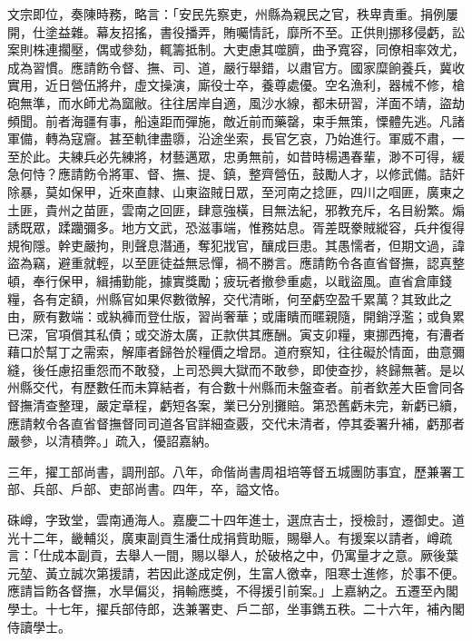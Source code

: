 \begin{pinyinscope}
文宗即位，奏陳時務，略言：「安民先察吏，州縣為親民之官，秩卑責重。捐例屢開，仕塗益雜。幕友招搖，書役播弄，賄囑情託，靡所不至。正供則挪移侵虧，訟案則株連擱壓，偶或參劾，輒籌抵制。大吏慮其噬臍，曲予寬容，同僚相率效尤，成為習慣。應請飭令督、撫、司、道，嚴行舉錯，以肅官方。國家糜餉養兵，冀收實用，近日營伍將弁，虛文操演，廝役士卒，養尊處優。空名漁利，器械不修，槍砲無準，而水師尤為窳敝。往往居岸自適，風沙水線，都未研習，洋面不靖，盜劫頻聞。前者海疆有事，船遠距而彈施，敵近前而藥罄，束手無策，慄體先逃。凡諸軍備，轉為寇齎。甚至軌律盡隳，沿途坐索，長官乞哀，乃始進行。軍威不肅，一至於此。夫練兵必先練將，材藝邁眾，忠勇無前，如昔時楊遇春輩，渺不可得，緩急何恃？應請飭令將軍、督、撫、提、鎮，整齊營伍，鼓勵人才，以修武備。詰奸除暴，莫如保甲，近來直隸、山東盜賊日眾，至河南之捻匪，四川之啯匪，廣東之土匪，貴州之苗匪，雲南之回匪，肆意強橫，目無法紀，邪教充斥，名目紛繁。煽誘既眾，蹂躪彌多。地方文武，恐滋事端，惟務姑息。胥差既豢賊縱容，兵弁復得規徇隱。幹吏嚴拘，則聲息潛通，奪犯戕官，釀成巨患。其愚懦者，但期文過，諱盜為竊，避重就輕，以至匪徒益無忌憚，禍不勝言。應請飭令各直省督撫，認真整頓，奉行保甲，緝捕勤能，據實獎勵；疲玩者撤參重處，以戢盜風。直省倉庫錢糧，各有定額，州縣官如果侭數徵解，交代清晰，何至虧空盈千累萬？其致此之由，厥有數端：或紈褲而登仕版，習尚奢華；或庸瞶而暱親隨，開銷浮濫；或負累已深，官項償其私債；或交游太廣，正款供其應酬。寅支卯糧，東挪西掩，有漕者藉口於幫丁之需索，解庫者歸咎於糧價之增昂。道府察知，往往礙於情面，曲意彌縫，後任慮招重怨而不敢發，上司恐興大獄而不敢參，即使查抄，終歸無著。是以州縣交代，有歷數任而未算結者，有合數十州縣而未盤查者。前者欽差大臣會同各督撫清查整理，嚴定章程，虧短各案，業已分別攤賠。第恐舊虧未完，新虧已續，應請敕令各直省督撫督同司道各官詳細查覈，交代未清者，停其委署升補，虧那者嚴參，以清積弊。」疏入，優詔嘉納。

三年，擢工部尚書，調刑部。八年，命偕尚書周祖培等督五城團防事宜，歷兼署工部、兵部、戶部、吏部尚書。四年，卒，謚文恪。

硃嶟，字致堂，雲南通海人。嘉慶二十四年進士，選庶吉士，授檢討，遷御史。道光十二年，畿輔災，廣東副貢生潘仕成捐貲助賑，賜舉人。有援案以請者，嶟疏言：「仕成本副貢，去舉人一間，賜以舉人，於破格之中，仍寓量才之意。厥後葉元堃、黃立誠次第援請，若因此遂成定例，生富人徼幸，阻寒士進修，於事不便。應請旨飭各督撫，水旱偏災，捐輸應獎，不得援引前案。」上嘉納之。五遷至內閣學士。十七年，擢兵部侍郎，迭兼署吏、戶二部，坐事鐫五秩。二十六年，補內閣侍讀學士。


\end{pinyinscope}
